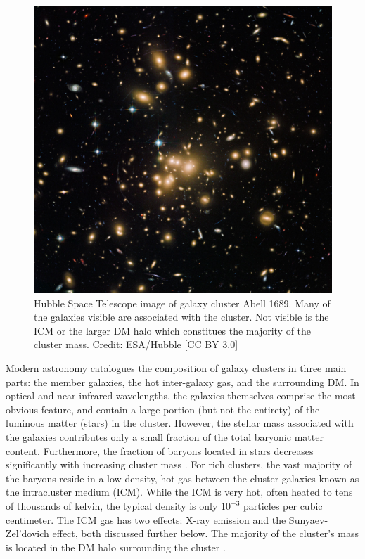 \begin{figure}[!ht]
	\begin{center}
		\includegraphics[height=0.5\textheight]{figures/abell1689_hubble.pdf} 
	\end{center}
	\caption[Hubble Space Telescope image of galaxy cluster Abell 1689.]{Hubble Space Telescope image of galaxy cluster Abell 1689. Many of the galaxies visible are associated with the cluster. Not visible is the ICM or the larger DM halo which constitues the majority of the cluster mass. Credit: ESA/Hubble [CC BY 3.0]}
	\label{fig: abell1689_hubble} 
\end{figure}

Modern astronomy catalogues the composition of galaxy clusters in three main parts: the member galaxies, the hot inter-galaxy gas, and the surrounding DM. In optical and near-infrared wavelengths, the galaxies themselves comprise the most obvious feature, and contain a large portion (but not the entirety) of the luminous matter (stars) in the cluster. However, the stellar mass associated with the galaxies contributes only a small fraction of the total baryonic matter content. Furthermore, the fraction of baryons located in stars decreases significantly with increasing cluster mass \citep{Gonzalez2007}. For rich clusters, the vast majority of the baryons reside in a low-density, hot gas between the cluster galaxies known as the intracluster medium (ICM). While the ICM is very hot, often heated to tens of thousands of kelvin, the typical density is only $10^{-3}$ particles per cubic centimeter. The ICM gas has two effects: X-ray emission and the Sunyaev-Zel'dovich effect, both discussed further below. The majority of the cluster's mass is located in the DM halo surrounding the cluster . 

